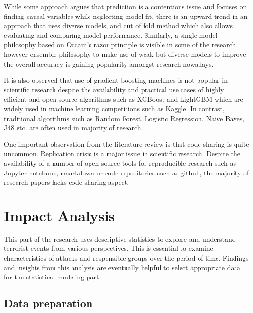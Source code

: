\documentclass[11pt,oneside,a4paper]{reedthesis}
\begin{document}
While some approach argues that prediction is a contentious issue and
focuses on finding causal variables while neglecting model fit, there is
an upward trend in an approach that uses diverse models, and out of fold
method which also allows evaluating and comparing model performance.
Similarly, a single model philosophy based on Occam's razor principle is
visible in some of the research however ensemble philosophy to make use
of weak but diverse models to improve the overall accuracy is gaining
popularity amongst research nowadays.

It is also observed that use of gradient boosting machines is not
popular in scientific research despite the availability and practical
use cases of highly efficient and open-source algorithms such as XGBoost
and LightGBM which are widely used in machine learning competitions such
as Kaggle. In contrast, traditional algorithms such as Random Forest,
Logistic Regression, Naive Bayes, J48 etc. are often used in majority of
research.

One important observation from the literature review is that code
sharing is quite uncommon. Replication crisis is a major issue in
scientific research. Despite the availability of a number of open source
tools for reproducible research such as Jupyter notebook, rmarkdown or
code repositories such as github, the majority of research papers lacks
code sharing aspect.

\hypertarget{impact-analysis}{\chapter{Impact
Analysis}\label{impact-analysis}}

This part of the research uses descriptive statistics to explore and
understand terrorist events from various perspectives. This is essential
to examine characteristics of attacks and responsible groups over the
period of time. Findings and insights from this analysis are eventually
helpful to select appropriate data for the statistical modeling part.

\section{Data preparation}\label{data-preparation}
\end{document}
